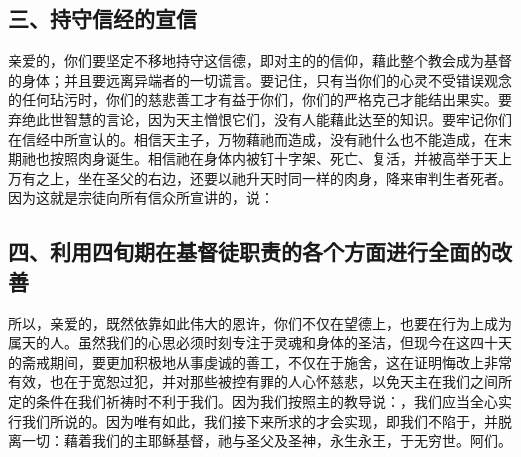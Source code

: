 
\subsection{三、持守信经的宣信}

亲爱的，你们要坚定不移地持守这信德，即对主的的信仰，藉此整个教会成为基督的身体；并且要远离异端者的一切谎言。要记住，只有当你们的心灵不受错误观念的任何玷污时，你们的慈悲善工才有益于你们，你们的严格克己才能结出果实。要弃绝此世智慧的言论，因为天主憎恨它们，没有人能藉此达至的知识。要牢记你们在信经中所宣认的。相信天主子，万物藉祂而造成，没有祂什么也不能造成，在末期祂也按照肉身诞生。相信祂在身体内被钉十字架、死亡、复活，并被高举于天上万有之上，坐在圣父的右边，还要以祂升天时同一样的肉身，降来审判生者死者。因为这就是宗徒向所有信众所宣讲的，说：\par


\subsection{四、利用四旬期在基督徒职责的各个方面进行全面的改善}

所以，亲爱的，既然依靠如此伟大的恩许，你们不仅在望德上，也要在行为上成为属天的人。虽然我们的心思必须时刻专注于灵魂和身体的圣洁，但现今在这四十天的斋戒期间，要更加积极地从事虔诚的善工，不仅在于施舍，这在证明悔改上非常有效，也在于宽恕过犯，并对那些被控有罪的人心怀慈悲，以免天主在我们之间所定的条件在我们祈祷时不利于我们。因为我们按照主的教导说：，我们应当全心实行我们所说的。因为唯有如此，我们接下来所求的才会实现，即我们不陷于，并脱离一切：藉着我们的主耶稣基督，祂与圣父及圣神，永生永王，于无穷世。阿们。\par


